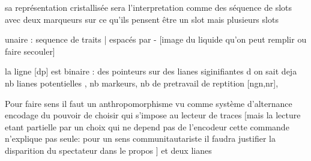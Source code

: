 \documentclass{article}
\begin{document}
  sa représentation cristallisée sera l'interpretation comme des séquence de slots  avec deux marqueurs  sur ce qu'ils pensent être un slot
mais plusieurs slots 

unaire : sequence de traits  | espacés par -   [image du liquide qu'on peut remplir ou faire secouler]


la ligne  [dp] est 
binaire :  des pointeurs sur des lianes siginifiantes d on sait deja nb lianes potentielles , nb markeurs,  nb de pretravail de reptition  [ngn,nr], 


 
  Pour faire sens il faut un anthropomorphisme vu comme système d'alternance  encodage du pouvoir de choisir qui s'impose au lecteur de traces 
  [mais la lecture etant partielle par un choix qui ne depend pas de l'encodeur cette commande n'explique pas seule: pour un sens communitautariste il faudra justifier la disparition du spectateur dans le propos  ]
   et deux lianes
% 
%
%
%  
%
%
%
%
\end{document}
